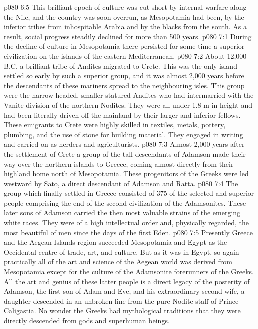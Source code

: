 \vs p080 6:5 This brilliant epoch of culture was cut short by internal warfare along the Nile, and the country was soon overrun, as Mesopotamia had been, by the inferior tribes from inhospitable Arabia and by the blacks from the south. As a result, social progress steadily declined for more than 500 years.
\vs p080 7:1 During the decline of culture in Mesopotamia there persisted for some time a superior civilization on the islands of the eastern Mediterranean.
\vs p080 7:2 About 12,000\,B.C. a brilliant tribe of Andites migrated to Crete. This was the only island settled so early by such a superior group, and it was almost 2,000 years before the descendants of these mariners spread to the neighbouring isles. This group were the narrow\hyp{}headed, smaller\hyp{}statured Andites who had intermarried with the Vanite division of the northern Nodites. They were all under 1.8 m in height and had been literally driven off the mainland by their larger and inferior fellows. These emigrants to Crete were highly skilled in textiles, metals, pottery, plumbing, and the use of stone for building material. They engaged in writing and carried on as herders and agriculturists.
\vs p080 7:3 Almost 2,000 years after the settlement of Crete a group of the tall descendants of Adamson made their way over the northern islands to Greece, coming almost directly from their highland home north of Mesopotamia. These progenitors of the Greeks were led westward by Sato, a direct descendant of Adamson and Ratta.
\vs p080 7:4 The group which finally settled in Greece consisted of 375 of the selected and superior people comprising the end of the second civilization of the Adamsonites. These later sons of Adamson carried the then most valuable strains of the emerging white races. They were of a high intellectual order and, physically regarded, the most beautiful of men since the days of the first Eden.
\vs p080 7:5 \pc Presently Greece and the Aegean Islands region succeeded Mesopotamia and Egypt as the Occidental centre of trade, art, and culture. But as it was in Egypt, so again practically all of the art and science of the Aegean world was derived from Mesopotamia except for the culture of the Adamsonite forerunners of the Greeks. All the art and genius of these latter people is a direct legacy of the posterity of Adamson, the first son of Adam and Eve, and his extraordinary second wife, a daughter descended in an unbroken line from the pure Nodite staff of Prince Caligastia. No wonder the Greeks had mythological traditions that they were directly descended from gods and superhuman beings.
